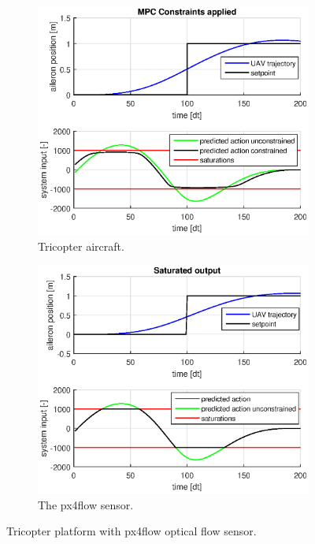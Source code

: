 \documentclass{article}
\begin{document}
\begin{figure}[tbp]
\centering

\begin{subfigure}[b]{0.55\textwidth}
	\includegraphics[width=\textwidth]{fig/step_constrained_2.eps}
	\caption{Tricopter aircraft.}
	\label{fig:tricopter}
\end{subfigure}%
\begin{subfigure}[b]{0.45\textwidth}
	\includegraphics[width=\textwidth]{fig/step_saturated_2.eps}
	\caption{The px4flow sensor.}
	\label{fig:px4flow}
\end{subfigure}

\caption{Tricopter platform with px4flow optical flow sensor.}
\label{fig:tricopter_px4flow}
\end{figure}
\end{document}
